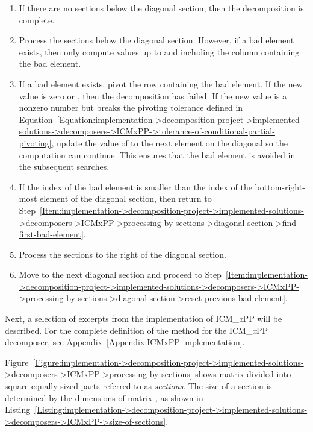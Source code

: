 \begin{enumerate}
\begin{enumerate}
		\end{enumerate}
	\item \label{Item:implementation->decomposition-project->implemented-solutions->decomposers->ICMxPP->processing-by-sections->no-lower-sections-check}
		If there are no sections below the diagonal section, then the decomposition is complete.
	\item \label{Item:implementation->decomposition-project->implemented-solutions->decomposers->ICMxPP->processing-by-sections->compute-lower-sections}
		Process the sections below the diagonal section. However, if a bad element exists, then only compute values up to and including the column containing the bad element.
	\item If a bad element exists, pivot the row containing the bad element. If the new value is zero or , then the decomposition has failed. If the new value is a nonzero number but breaks the pivoting tolerance defined in Equation~\ref{Equation:implementation->decomposition-project->implemented-solutions->decomposers->ICMxPP->tolerance-of-conditional-partial-pivoting}, update the value of  to the next element on the diagonal so the computation can continue. This ensures that the bad element is avoided in the subsequent searches.
	\item \label{Item:implementation->decomposition-project->implemented-solutions->decomposers->ICMxPP->processing-by-sections->diagonal-lower-sections-while-condition}
		If the index of the bad element is smaller than the index of the bottom-right-most element of the diagonal section, then return to Step~\ref{Item:implementation->decomposition-project->implemented-solutions->decomposers->ICMxPP->processing-by-sections->diagonal-section->find-first-bad-element}.
	\item Process the sections to the right of the diagonal section.
	\item Move to the next diagonal section and proceed to Step~\ref{Item:implementation->decomposition-project->implemented-solutions->decomposers->ICMxPP->processing-by-sections->diagonal-section->reset-previous-bad-element}.
\end{enumerate}

Next, a selection of excerpts from the implementation of ICM\_\textit{x}PP will be described. For the complete definition of the  method for the ICM\_\textit{x}PP decomposer, see Appendix~\ref{Appendix:ICMxPP-implementation}.

Figure~\ref{Figure:implementation->decomposition-project->implemented-solutions->decomposers->ICMxPP->processing-by-sections} shows matrix  divided into square equally-sized parts referred to as \textit{sections}. The size of a section is determined by the dimensions of matrix , as shown in Listing~\ref{Listing:implementation->decomposition-project->implemented-solutions->decomposers->ICMxPP->size-of-sections}.


